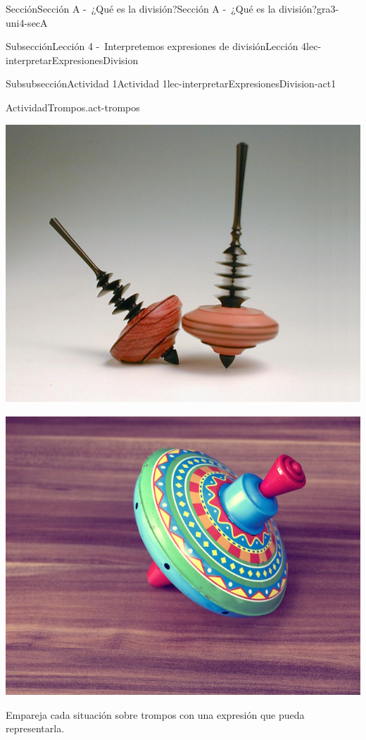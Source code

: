 \documentclass[twoside,10pt,]{article}
\begin{document}
\begin{sectionptx}{Sección}{Sección A -~¿Qué es la división?}{}{Sección A -~¿Qué es la división?}{}{}{gra3-uni4-secA}
\begin{subsectionptx}{Subsección}{Lección 4 -~Interpretemos expresiones de división}{}{Lección 4}{}{}{lec-interpretarExpresionesDivision}
\begin{subsubsectionptx}{Subsubsección}{Actividad 1}{}{Actividad 1}{}{}{lec-interpretarExpresionesDivision-act1}
\begin{activity}{Actividad}{Trompos.}{act-trompos}
\begin{sidebyside}{5}{0}{0}{0}
\begin{sbspanel}{0.2}
\includegraphics[width=\linewidth]{external/png-source/V1 3.4.A.4 German Kreisel Copy.png}
\end{sbspanel}%
\begin{sbspanel}{0.2}%
\includegraphics[width=\linewidth]{external/jpg-source/V1 3.4.A.4 Colorful Top.jpg}
\end{sbspanel}%
\end{sidebyside}%
\par
Empareja cada situación sobre trompos con una expresión que pueda representarla.%
\begin{sidebyside}{2}{0.05}{0}{0.15}%
\begin{sbspanel}{0.6}%

\end{sbspanel}
\end{sidebyside}
\end{activity}
\end{subsubsectionptx}
\end{subsectionptx}
\end{sectionptx}
\end{document}
